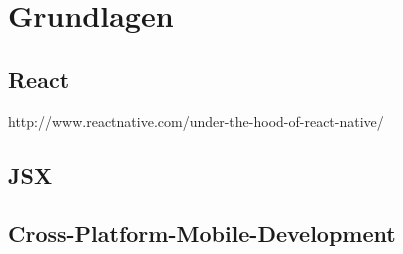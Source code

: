 \section{Grundlagen}

\subsection{React}
http://www.reactnative.com/under-the-hood-of-react-native/
\subsection{JSX}

\subsection{Cross-Platform-Mobile-Development}